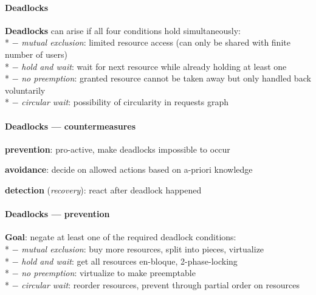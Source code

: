 \paragraph{Deadlocks}
\begin{items}
  \item \textbf{Deadlocks} can arise if all four conditions hold simultaneously: \\*
    $ - $ \emph{mutual exclusion}: limited resource access (can only be shared with finite number of users) \\*
    $ - $ \emph{hold and wait}: wait for next resource while already holding at least one \\*
    $ - $ \emph{no preemption}: granted resource cannot be taken away but only handled back voluntarily \\*
    $ - $ \emph{circular wait}: possibility of circularity in requests graph
\end{items}

\paragraph{Deadlocks --- countermeasures}
\begin{items}
  \item \textbf{prevention}: pro-active, make deadlocks impossible to occur
  \item \textbf{avoidance}: decide on allowed actions based on a-priori knowledge
  \item \textbf{detection} (\emph{recovery}): react after deadlock happened
\end{items}

\paragraph{Deadlocks --- prevention}
\begin{items}
  \item \textbf{Goal}: negate at least one of the required deadlock conditions: \\*
    $ - $ \emph{mutual exclusion}: buy more resources, split into pieces, virtualize \\*
    $ - $ \emph{hold and wait}: get all resources en-bloque, 2-phase-locking \\*
    $ - $ \emph{no preemption}: virtualize to make preemptable \\*
    $ - $ \emph{circular wait}: reorder resources, prevent through partial order on resources
\end{items}

